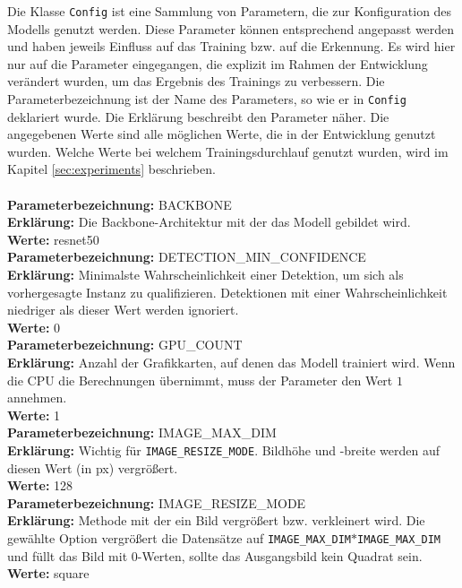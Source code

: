 Die Klasse \texttt{Config} ist eine Sammlung von Parametern, die zur Konfiguration des Modells genutzt werden. Diese Parameter können entsprechend angepasst werden und haben jeweils Einfluss auf das Training bzw. auf die Erkennung. Es wird hier nur auf die Parameter eingegangen, die explizit im Rahmen der Entwicklung verändert wurden, um das Ergebnis des Trainings zu verbessern. Die Parameterbezeichnung ist der Name des Parameters, so wie er in \texttt{Config} deklariert wurde. Die Erklärung beschreibt den Parameter näher. Die angegebenen Werte sind alle möglichen Werte, die in der Entwicklung genutzt wurden. Welche Werte bei welchem Trainingsdurchlauf genutzt wurden, wird im Kapitel \ref{sec:experiments} beschrieben.
\\\\
\noindent
\textbf{Parameterbezeichnung:} BACKBONE\\
\textbf{Erklärung:} Die Backbone-Architektur mit der das Modell gebildet wird.\\
\textbf{Werte:} resnet50\\

\noindent
\textbf{Parameterbezeichnung:} DETECTION\_MIN\_CONFIDENCE\\
\textbf{Erklärung:} Minimalste Wahrscheinlichkeit einer Detektion, um sich als vorhergesagte Instanz zu qualifizieren. Detektionen mit einer Wahrscheinlichkeit niedriger als dieser Wert werden ignoriert.\\
\textbf{Werte:} 0\\

\noindent
\textbf{Parameterbezeichnung:} GPU\_COUNT\\
\textbf{Erklärung:} Anzahl der Grafikkarten, auf denen das Modell trainiert wird. Wenn die CPU die Berechnungen übernimmt, muss der Parameter den Wert $1$ annehmen.\\
\textbf{Werte:} 1\\

\noindent
\textbf{Parameterbezeichnung:} IMAGE\_MAX\_DIM\\
\textbf{Erklärung:} Wichtig für \texttt{IMAGE\_RESIZE\_MODE}. Bildhöhe und -breite werden auf diesen Wert (in px) vergrößert.\\
\textbf{Werte:} 128\\

\noindent
\textbf{Parameterbezeichnung:} IMAGE\_RESIZE\_MODE\\
\textbf{Erklärung:} Methode mit der ein Bild vergrößert bzw. verkleinert wird. Die gewählte Option vergrößert die Datensätze auf \texttt{IMAGE\_MAX\_DIM}$*$\texttt{IMAGE\_MAX\_DIM} und füllt das Bild mit 0-Werten, sollte das Ausgangsbild kein Quadrat sein.\\
\textbf{Werte:} square\\

